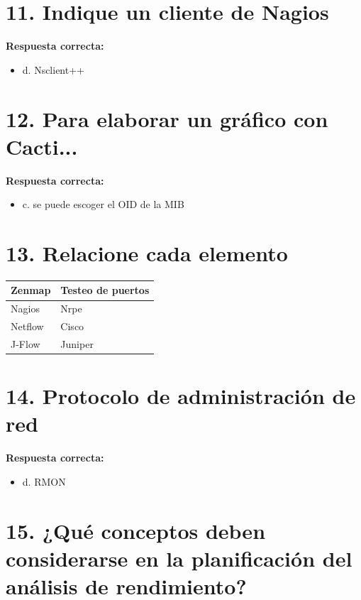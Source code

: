 \documentclass[12pt]{article}
\begin{document}
\section*{11. Indique un cliente de Nagios}

\textbf{Respuesta correcta:}

\begin{itemize}
    \item d. Nsclient++
\end{itemize}

\section*{12. Para elaborar un gráfico con Cacti...}

\textbf{Respuesta correcta:}

\begin{itemize}
    \item c. se puede escoger el OID de la MIB
\end{itemize}

\section*{13. Relacione cada elemento}

\begin{center}
\begin{tabular}{|l|l|}
\hline
Zenmap & Testeo de puertos \\
\hline
Nagios & Nrpe \\
\hline
Netflow & Cisco \\
\hline
J-Flow & Juniper \\
\hline
\end{tabular}
\end{center}

\section*{14. Protocolo de administración de red}

\textbf{Respuesta correcta:}

\begin{itemize}
    \item d. RMON
\end{itemize}

\section*{15. ¿Qué conceptos deben considerarse en la planificación del análisis de rendimiento?}
\end{document}
